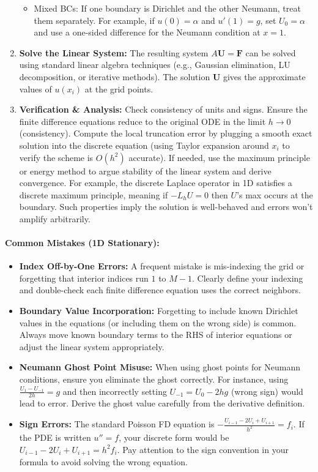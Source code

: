 \documentclass[a4paper,11pt]{report}
\begin{document}
\begin{enumerate}
\begin{itemize}
              \item Mixed BCs: If one boundary is Dirichlet and the other Neumann, treat them separately. For example, if $u(0)=\alpha$ and $u'(1)=g$, set $U_0=\alpha$ and use a one-sided difference for the Neumann condition at $x=1$.
          \end{itemize}
    \item \textbf{Solve the Linear System:} The resulting system $A\mathbf{U} = \mathbf{F}$ can be solved using standard linear algebra techniques (e.g., Gaussian elimination, LU decomposition, or iterative methods). The solution $\mathbf{U}$ gives the approximate values of $u(x_i)$ at the grid points.
    \item \textbf{Verification \& Analysis:} Check consistency of units and signs. Ensure the finite difference equations reduce to the original ODE in the limit $h\to 0$ (consistency). Compute the local truncation error by plugging a smooth exact solution into the discrete equation (using Taylor expansion around $x_i$ to verify the scheme is $O(h^2)$ accurate). If needed, use the maximum principle or energy method to argue stability of the linear system and derive convergence. For example, the discrete Laplace operator in 1D satisfies a discrete maximum principle, meaning if $-L_h U = 0$ then $U$’s max occurs at the boundary. Such properties imply the solution is well-behaved and errors won’t amplify arbitrarily.
\end{enumerate}

\paragraph{Common Mistakes (1D Stationary):}
\begin{itemize}
    \item \textbf{Index Off-by-One Errors:} A frequent mistake is mis-indexing the grid or forgetting that interior indices run $1$ to $M-1$. Clearly define your indexing and double-check each finite difference equation uses the correct neighbors.
    \item \textbf{Boundary Value Incorporation:} Forgetting to include known Dirichlet values in the equations (or including them on the wrong side) is common. Always move known boundary terms to the RHS of interior equations or adjust the linear system appropriately.
    \item \textbf{Neumann Ghost Point Misuse:} When using ghost points for Neumann conditions, ensure you eliminate the ghost correctly. For instance, using $\frac{U_1 - U_{-1}}{2h}=g$ and then incorrectly setting $U_{-1}=U_0 - 2hg$ (wrong sign) would lead to error. Derive the ghost value carefully from the derivative definition.
    \item \textbf{Sign Errors:} The standard Poisson FD equation is $- \frac{U_{i-1}-2U_i+U_{i+1}}{h^2} = f_i$. If the PDE is written $u''=f$, your discrete form would be $U_{i-1}-2U_i+U_{i+1} = h^2 f_i$. Pay attention to the sign convention in your formula to avoid solving the wrong equation.
\end{itemize}
\end{document}
